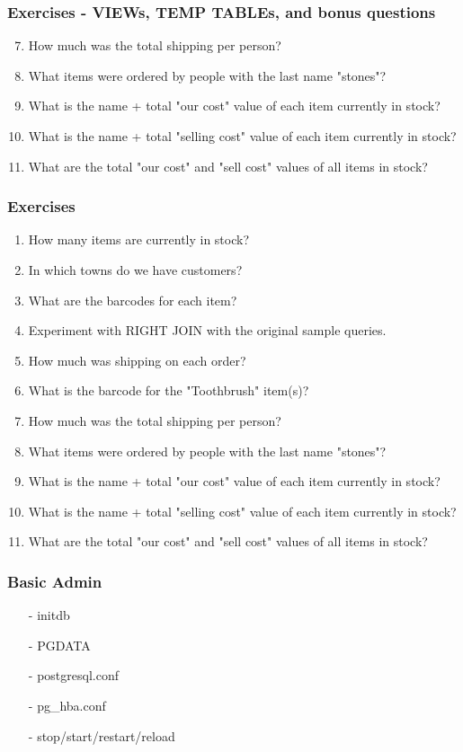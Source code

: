 \documentclass[20pt]{beamer}
\begin{document}
\frame
{
    \frametitle{Exercises - VIEWs, TEMP TABLEs, and bonus questions}
    \begin{enumerate}
    \setcounter{enumi}{6}
    \item How much was the total shipping per person?
    \item What items were ordered by people with the last name "stones"?
    \item What is the name + total "our cost" value of each item currently in stock?
    \item What is the name + total "selling cost" value of each item currently in stock?
    \item What are the total "our cost" and "sell cost" values of all items in stock?
    \end{enumerate}
}

\frame
{
    \frametitle{Exercises}
    \begin{enumerate}
    \small
    \item How many items are currently in stock?
    \item In which towns do we have customers?
    \item What are the barcodes for each item?
    \item Experiment with RIGHT JOIN with the original sample queries.
    \item How much was shipping on each order?
    \item What is the barcode for the "Toothbrush" item(s)?
    \item How much was the total shipping per person?
    \item What items were ordered by people with the last name "stones"?
    \item What is the name + total "our cost" value of each item currently in stock?
    \item What is the name + total "selling cost" value of each item currently in stock?
    \item What are the total "our cost" and "sell cost" values of all items in stock?
    \end{enumerate}
}

\frame
{
    \frametitle{Basic Admin}
    \begin{itemize}
    \item[-] initdb
    \item[-] PGDATA
    \item[-] postgresql.conf
    \item[-] pg\_hba.conf
    \item[-] stop/start/restart/reload
    \end{itemize}
}
\end{document}
